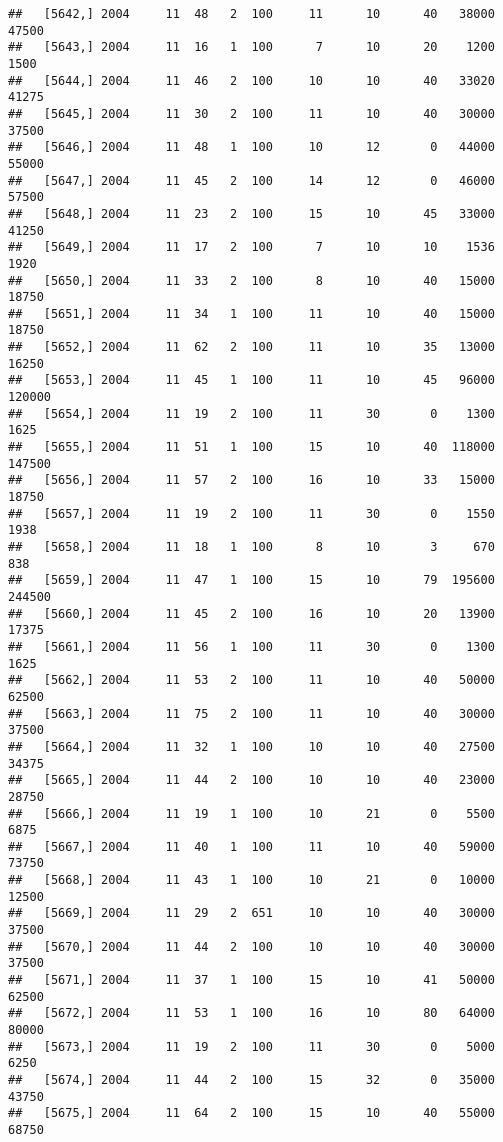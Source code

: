 \documentclass{article}\usepackage[]{graphicx}\usepackage[]{color}
\makeatletter
\newenvironment{kframe}{%
 \def\at@end@of@kframe{}%
 \ifinner\ifhmode%
  \def\at@end@of@kframe{\end{minipage}}%
  \begin{minipage}{\columnwidth}%
 \fi\fi%
 \def\FrameCommand##1{\hskip\@totalleftmargin \hskip-\fboxsep
 \colorbox{shadecolor}{##1}\hskip-\fboxsep
     \hskip-\linewidth \hskip-\@totalleftmargin \hskip\columnwidth}%
 \MakeFramed {\advance\hsize-\width
   \@totalleftmargin\z@ \linewidth\hsize
   \@setminipage}}%
 {\par\unskip\endMakeFramed%
 \at@end@of@kframe}
\newenvironment{knitrout}{}{} %
\makeatother
\begin{document}
\begin{knitrout}
\begin{kframe}
\begin{verbatim}
##   [5642,] 2004     11  48   2  100     11      10      40   38000   47500
##   [5643,] 2004     11  16   1  100      7      10      20    1200    1500
##   [5644,] 2004     11  46   2  100     10      10      40   33020   41275
##   [5645,] 2004     11  30   2  100     11      10      40   30000   37500
##   [5646,] 2004     11  48   1  100     10      12       0   44000   55000
##   [5647,] 2004     11  45   2  100     14      12       0   46000   57500
##   [5648,] 2004     11  23   2  100     15      10      45   33000   41250
##   [5649,] 2004     11  17   2  100      7      10      10    1536    1920
##   [5650,] 2004     11  33   2  100      8      10      40   15000   18750
##   [5651,] 2004     11  34   1  100     11      10      40   15000   18750
##   [5652,] 2004     11  62   2  100     11      10      35   13000   16250
##   [5653,] 2004     11  45   1  100     11      10      45   96000  120000
##   [5654,] 2004     11  19   2  100     11      30       0    1300    1625
##   [5655,] 2004     11  51   1  100     15      10      40  118000  147500
##   [5656,] 2004     11  57   2  100     16      10      33   15000   18750
##   [5657,] 2004     11  19   2  100     11      30       0    1550    1938
##   [5658,] 2004     11  18   1  100      8      10       3     670     838
##   [5659,] 2004     11  47   1  100     15      10      79  195600  244500
##   [5660,] 2004     11  45   2  100     16      10      20   13900   17375
##   [5661,] 2004     11  56   1  100     11      30       0    1300    1625
##   [5662,] 2004     11  53   2  100     11      10      40   50000   62500
##   [5663,] 2004     11  75   2  100     11      10      40   30000   37500
##   [5664,] 2004     11  32   1  100     10      10      40   27500   34375
##   [5665,] 2004     11  44   2  100     10      10      40   23000   28750
##   [5666,] 2004     11  19   1  100     10      21       0    5500    6875
##   [5667,] 2004     11  40   1  100     11      10      40   59000   73750
##   [5668,] 2004     11  43   1  100     10      21       0   10000   12500
##   [5669,] 2004     11  29   2  651     10      10      40   30000   37500
##   [5670,] 2004     11  44   2  100     10      10      40   30000   37500
##   [5671,] 2004     11  37   1  100     15      10      41   50000   62500
##   [5672,] 2004     11  53   1  100     16      10      80   64000   80000
##   [5673,] 2004     11  19   2  100     11      30       0    5000    6250
##   [5674,] 2004     11  44   2  100     15      32       0   35000   43750
##   [5675,] 2004     11  64   2  100     15      10      40   55000   68750

\end{verbatim}
\end{kframe}
\end{knitrout}
\end{document}
